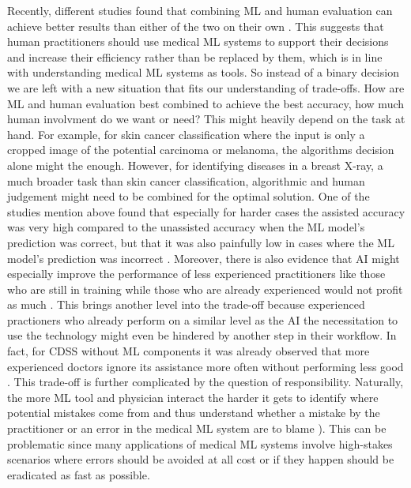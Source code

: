 Recently, different studies found that combining ML and human evaluation can achieve better results than either of the two on their own \cite{rajpurkar2022ai, kiani2020impact, topol2019high, steiner2018impact}. This suggests that human practitioners should use medical ML systems to support their decisions and increase their efficiency rather than be replaced by them, which is in line with understanding medical ML systems as tools. So instead of a binary decision we are left with a new situation that fits our understanding of trade-offs. How are ML and human evaluation best combined to achieve the best accuracy, how much human involvment do we want or need? This might heavily depend on the task at hand. For example, for skin cancer classification where the input is only a cropped image of the potential carcinoma or melanoma, the algorithms decision alone might the enough. However, for identifying diseases in a breast X-ray, a much broader task than skin cancer classification, algorithmic and human judgement might need to be combined for the optimal solution.  One of the studies mention above found that especially for harder cases the assisted accuracy was very high compared to the unassisted accuracy when the ML model's prediction was correct, but that it was also painfully low in cases where the ML model's prediction was incorrect \cite{kiani2020impact}. Moreover, there is also evidence that AI might especially improve the performance of less experienced practitioners like those who are still in training while those who are already experienced would not profit as much \cite{rajpurkar2022ai}. This brings another level into the trade-off because experienced practioners who already perform on a similar level as the AI the necessitation to use the technology might even be hindered by another step in their workflow. In fact, for CDSS without ML components it was already observed that more experienced doctors ignore its assistance more often without performing less good \cite{sutton2020overview}.
This trade-off is further complicated by the question of responsibility. Naturally, the more ML tool and physician interact the harder it gets to identify where potential mistakes come from and thus understand whether a mistake by the practitioner or an error in the medical ML system are to blame \cite{horgan2019artificial}). This can be problematic since many applications of medical ML systems involve high-stakes scenarios where errors should be avoided at all cost or if they happen should be eradicated as fast as possible.

